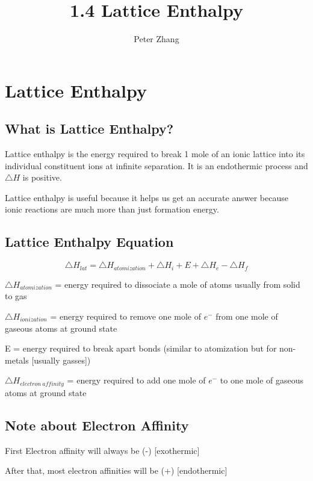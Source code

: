 \documentclass[12pt]{article} %
\title{1.4 Lattice Enthalpy}
\author{Peter Zhang}
\begin{document}
\maketitle

\pagebreak

\tableofcontents

\pagebreak

\section{Lattice Enthalpy}
\subsection{What is Lattice Enthalpy?}
Lattice enthalpy is the energy required to break 1 mole of an ionic lattice into its individual constituent ions at infinite separation. It is an endothermic process and $\triangle{H}$ is positive.

Lattice enthalpy is useful because it helps us get an accurate answer because ionic reactions are much more than just formation energy. 

\subsection{Lattice Enthalpy Equation}
$$\triangle{H}_{lat} = \triangle{H}_{atomization} + \triangle{H}_i + E + \triangle{H}_e - \triangle{H}_f$$

$\triangle{H}_{atomization}$ = energy required to dissociate a mole of atoms usually from solid to gas

$\triangle{H}_{ionization}$ = energy required to remove one mole of $e^-$ from one mole of gaseous atoms at ground state

E = energy required to break apart bonds (similar to atomization but for non-metals [usually gasses])

$\triangle{H}_{electron\ affinity}$ = energy required to add one mole of $e^-$ to one mole of gaseous atoms at ground state

\subsection{Note about Electron Affinity}

First Electron affinity will always be (-) [exothermic]

After that, most electron affinities will be (+) [endothermic]

\pagebreak
\end{document}
